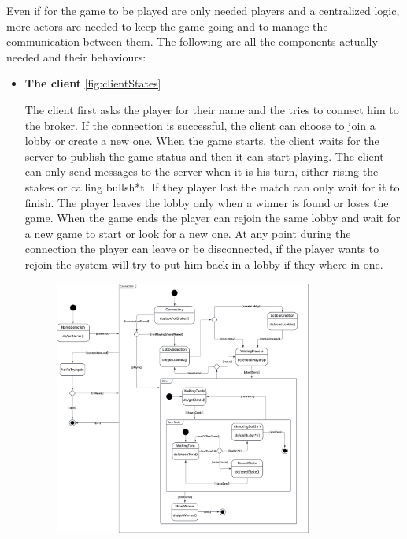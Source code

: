 \documentclass{scrartcl}
\begin{document}
Even if for the game to be played are only needed players and a centralized logic,
more actors are needed to keep the game going and to manage the communication between them. \newline
The following are all the components actually needed and their behaviours:
\begin{itemize}
  \item
  \textbf{The client} \cref{fig:clientStates} \par
  The client first asks the player for their name and the tries to connect him to the broker. 
  If the connection is successful, the client can choose to join a lobby or create a new one. \newline
  When the game starts, the client waits for the server to publish the game status and then it can start playing.
  The client can only send messages to the server when it is his turn, either rising the stakes 
  or calling bullsh*t. If they player lost the match can only wait for it to finish.
  The player leaves the lobby only when a winner is found or loses the game. When the game ends the
  player can rejoin the same lobby and wait for a new game to start or look for a new one. \newline
  At any point during the connection the player can leave or be disconnected, if the player wants to rejoin
  the system will try to put him back in a lobby if they where in one.
  \begin{figure}[H]
    \centering
    \includegraphics[width=0.8\textwidth]{figures/clientStates.png}

\end{figure}
\end{itemize}
\end{document}
